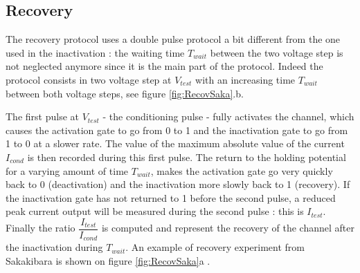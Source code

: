 \documentclass[11pt]{report}
\begin{document}
\subsection{Recovery}

The recovery protocol uses a double pulse protocol a bit different from the one used in the inactivation : the waiting time $T_{wait}$ between the two voltage step is not neglected anymore since it is the main part of the protocol. Indeed the protocol consists in two voltage step at $V_{test}$ with an increasing time $T_{wait}$ between both voltage steps, see figure \ref{fig:RecovSaka}.b.

The first pulse at $V_{test}$ - the conditioning pulse - fully activates the channel, which causes the activation gate to go from 0 to 1 and the inactivation gate to go from 1 to 0 at a slower rate. The value of the maximum absolute value of the current $I_{cond}$ is then recorded during this first pulse. The return to the holding potential for a varying amount of time $T_{wait}$, makes the activation gate go very quickly back to 0 (deactivation) and the inactivation more slowly back to 1 (recovery). If the inactivation gate has not returned to 1 before the second pulse, a reduced peak current output will be measured during the second pulse : this is $I_{test}$. Finally the ratio $\dfrac{I_{test}}{I_{cond}}$ is computed and represent the recovery of the channel after the inactivation during $T_{wait}$. An example of recovery experiment from Sakakibara \cite{Sakakibara1992} is shown on figure \ref{fig:RecovSaka}a .
\end{document}
